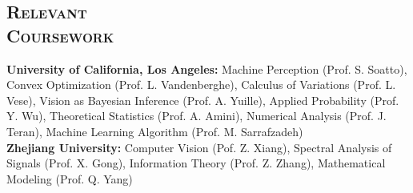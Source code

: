 \documentclass[margin, line, 10pt]{res} %
\begin{document}
\begin{resume}
\section{\textsc{Relevant\\Coursework}}
\textbf{University of California, Los Angeles:} Machine Perception (Prof. S. Soatto), Convex Optimization (Prof. L. Vandenberghe), Calculus of Variations (Prof. L. Vese), Vision as Bayesian Inference (Prof. A. Yuille), Applied Probability (Prof. Y. Wu), Theoretical Statistics (Prof. A. Amini), Numerical Analysis (Prof. J. Teran), Machine Learning Algorithm (Prof. M. Sarrafzadeh)\\
\textbf{Zhejiang University:} Computer Vision (Pof. Z. Xiang), Spectral Analysis of Signals (Prof. X. Gong), Information Theory (Prof. Z. Zhang), Mathematical Modeling (Prof. Q. Yang)



\end{resume}
\end{document}
